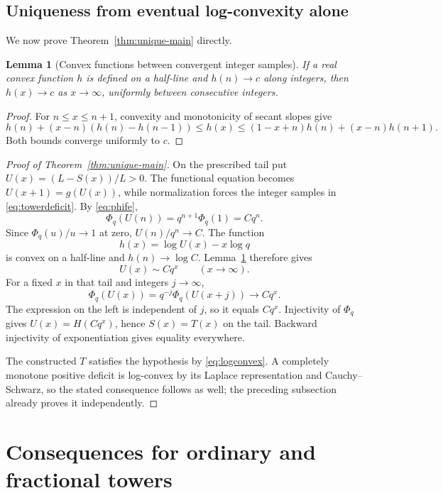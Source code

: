 \documentclass[11pt,letterpaper]{article}
\newtheorem{lemma}[theorem]{Lemma}
\theoremstyle{definition}\newtheorem{definition}[theorem]{Definition}
\theoremstyle{remark}\newtheorem{remark}[theorem]{Remark}
\newcommand{\PhiQ}{\Phi_q}
\numberwithin{equation}{section}
\begin{document}
\subsection{Uniqueness from eventual log-convexity alone}
We now prove Theorem~\ref{thm:unique-main} directly.

\begin{lemma}[Convex functions between convergent integer samples]\label{lem:convex}
If a real convex function $h$ is defined on a half-line and $h(n)\to c$ along integers, then $h(x)\to c$ as $x\to\infty$, uniformly between consecutive integers.
\end{lemma}
\begin{proof}
For $n\leq x\leq n+1$, convexity and monotonicity of secant slopes give
\[
 h(n)+(x-n)(h(n)-h(n-1))\leq h(x)
 \leq(1-x+n)h(n)+(x-n)h(n+1).
\]
Both bounds converge uniformly to $c$.
\end{proof}

\begin{proof}[Proof of Theorem~\ref{thm:unique-main}]
On the prescribed tail put $U(x)=(L-S(x))/L>0$. The functional equation becomes $U(x+1)=g(U(x))$, while normalization forces the integer samples in \eqref{eq:towerdeficit}. By \eqref{eq:phife},
\[
 \PhiQ(U(n))=q^{n+1}\PhiQ(1)=Cq^n.
\]
Since $\PhiQ(u)/u\to1$ at zero, $U(n)/q^n\to C$. The function
\[
 h(x)=\log U(x)-x\log q
\]
is convex on a half-line and $h(n)\to\log C$. Lemma~\ref{lem:convex} therefore gives
\begin{equation}\label{eq:asymptphase}
 U(x)\sim Cq^x\qquad(x\to\infty).
\end{equation}
For a fixed $x$ in that tail and integers $j\to\infty$,
\[
 \PhiQ(U(x))=q^{-j}\PhiQ(U(x+j))
 \longrightarrow Cq^x.
\]
The expression on the left is independent of $j$, so it equals $Cq^x$. Injectivity of $\PhiQ$ gives $U(x)=H(Cq^x)$, hence $S(x)=T(x)$ on the tail. Backward injectivity of exponentiation gives equality everywhere.

The constructed $T$ satisfies the hypothesis by \eqref{eq:logconvex}. A completely monotone positive deficit is log-convex by its Laplace representation and Cauchy--Schwarz, so the stated consequence follows as well; the preceding subsection already proves it independently.
\end{proof}

\section{Consequences for ordinary and fractional towers}\label{sec:consequences}
\end{document}
